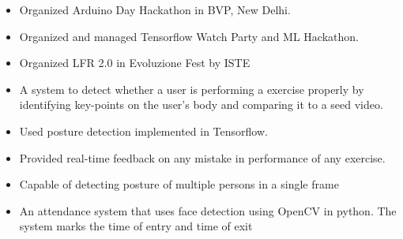 
\begin{itemize}
    \item Organized Arduino Day Hackathon in BVP, New Delhi.
    \item Organized and managed Tensorflow Watch Party and ML Hackathon.
    \item Organized LFR 2.0 in Evoluzione Fest by ISTE
\end{itemize}








\begin{itemize}
\item A system to detect whether a user is performing a exercise properly by identifying key-points on the user's body and comparing it to a seed video.
\item Used posture detection implemented in Tensorflow.
\item Provided real-time feedback on any mistake in performance of any exercise. 
\item Capable of detecting posture of multiple persons in a single frame
\end{itemize}

\smallskip
\smallskip

\begin{itemize}
\item An attendance system that uses face detection using OpenCV in python. The system marks the time of entry and time of exit 
\end{itemize}
\smallskip
\smallskip

